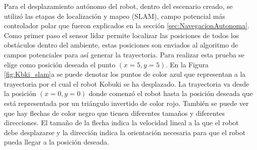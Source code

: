 Para el desplazamiento autónomo del robot, dentro del escenario creado, se utilizó las 
etapas de localización y mapeo (SLAM), campo potencial más controlador polar que fueron 
explicados en la sección \ref{sec:NavegacionAutonoma}. Como primer paso el sensor lídar 
permite localizar las posiciones de todos los obstáculos dentro del ambiente, estas 
posiciones son enviados al algoritmo de campos potenciales para así generar la 
trayectoria. Para realizar esta prueba se elige como posición deseada el punto 
$(x = 5, y = 5)$. En la Figura \ref{fig:Kbki_slam}a se puede denotar los puntos de color 
azul que representan a la trayectoria por el cual el robot Kobuki se ha desplazado. La 
trayectoria va desde la posición $(x = 0, y = 0)$ donde comenzó el robot hasta la posición
deseada que está representada por un triángulo invertido de color rojo. También se puede 
ver que hay flechas de color negro que tienen diferentes tamaños y diferentes direcciones.
El tamaño de la flecha indica la velocidad lineal a la que el robot debe desplazarse y 
la dirección indica la orientación necesaria para que el robot pueda llegar a la 
posición deseada.


